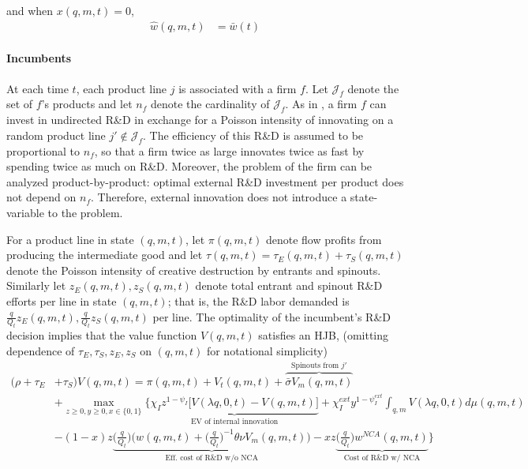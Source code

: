 \documentclass[11pt,english]{article}
\theoremstyle{remark}
\begin{document}
and when $x(q,m,t) = 0$, 
\begin{align}
\hat{w}(q,m,t) &= \bar{w}(t) \label{wage_rd}
\end{align}


\paragraph{Incumbents}

At each time $t$, each product line $j$ is associated with a firm $f$. Let $\mathcal{J}_f$ denote the set of $f$'s products and let $n_f$ denote the cardinality of $\mathcal{J}_f$. As in \cite{klette_innovating_2004}, a firm $f$ can invest in undirected R\&D in exchange for a Poisson intensity of innovating on a random product line $j' \notin \mathcal{J}_f$. The efficiency of this R\&D is assumed to be proportional to $n_f$, so that a firm twice as large innovates twice as fast by spending twice as much on R\&D. Moreover, the problem of the firm can be analyzed product-by-product: optimal external R\&D investment per product does not depend on $n_f$. Therefore, external innovation does not introduce a state-variable to the problem.

For a product line in state $(q,m,t)$, let $\pi(q,m,t)$ denote flow profits from producing the intermediate good and let $\tau(q,m,t) = \tau_E(q,m,t) + \tau_S(q,m,t)$ denote the Poisson intensity of creative destruction by entrants and spinouts. Similarly let $z_E(q,m,t),z_S(q,m,t)$ denote total entrant and spinout R\&D efforts per line in state $(q,m,t)$; that is, the R\&D labor demanded is $\frac{q}{Q_t}z_E(q,m,t), \frac{q}{Q_t}z_S(q,m,t)$ per line. The optimality of the incumbent's R\&D decision implies that the value function $V(q,m,t)$ satisfies an HJB, (omitting dependence of $\tau_E,\tau_S,z_E,z_S$ on $(q,m,t)$ for notational simplicity)
\begin{align}
(\rho + \tau_E& + \tau_S) V(q,m,t) = \pi(q,m,t) + V_t(q,m,t) + \overbrace{\bar{\sigma}V_m(q,m,t)}^{\textrm{Spinouts from $j'$}}  \nonumber \\ 
&+ \max_{z \ge 0, y \ge 0, x\in \{0,1\}} \Big\{ \underbrace{\chi_I z^{1-\psi_I} \Big[V(\lambda q,0,t) - V(q,m,t) \Big]}_{\textrm{EV of internal innovation}} + \chi_I^{ext} y^{1-\psi_I^{ext}} \int_{q,m} V(\lambda q, 0 ,t) d\mu(q,m,t) \\
&-(1-x) z \underbrace{\Big(\frac{q}{Q_t}\Big) \Big(  w(q,m,t) + \Big(\frac{q}{Q_t}\Big)^{-1} \theta \nu V_m(q,m,t) \Big)}_{\textrm{Eff. cost of R\&D w/o NCA}} - xz \underbrace{\Big( \frac{q}{Q_t} \Big) w^{NCA}(q,m,t)}_{\textrm{Cost of R\&D w/ NCA}} \Big\} \label{HJB_I}
\end{align}
\end{document}
